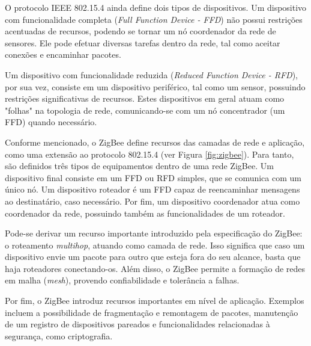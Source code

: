 O protocolo IEEE 802.15.4 ainda define dois tipos de dispositivos. Um dispositivo com funcionalidade completa (\textit{Full Function Device - FFD}) não possui restrições acentuadas de recursos, podendo se tornar um nó coordenador da rede de sensores. Ele pode efetuar diversas tarefas dentro da rede, tal como aceitar conexões e encaminhar pacotes. 

Um dispositivo com funcionalidade reduzida (\textit{Reduced Function Device - RFD}), por sua vez, consiste em um dispositivo periférico, tal como um sensor, possuindo restrições significativas de recursos. Estes dispositivos em geral atuam como "folhas" na topologia de rede, comunicando-se com um nó concentrador (um FFD) quando necessário.

Conforme mencionado, o ZigBee define recursos das camadas de rede e aplicação, como uma extensão ao protocolo 802.15.4 (ver Figura \ref{fig:zigbee}). Para tanto, são definidos três tipos de equipamentos dentro de uma rede ZigBee. Um dispositivo final consiste em um FFD ou RFD simples, que se comunica com um único nó. Um dispositivo roteador é um FFD capaz de reencaminhar mensagens  ao destinatário, caso necessário. Por fim, um dispositivo coordenador atua como coordenador da rede, possuindo também as funcionalidades de um roteador.

Pode-se derivar um recurso importante introduzido pela especificação do ZigBee: o roteamento \textit{multihop}, atuando como camada de rede. Isso significa que caso um dispositivo envie um pacote para outro que esteja fora do seu alcance, basta que haja roteadores conectando-os. Além disso, o ZigBee permite a formação de redes em malha (\textit{mesh}), provendo confiabilidade e tolerância a falhas.

Por fim, o ZigBee introduz recursos importantes em nível de aplicação. Exemplos incluem a possibilidade de fragmentação e remontagem de pacotes, manutenção de um registro de dispositivos pareados e funcionalidades relacionadas à segurança, como criptografia.

